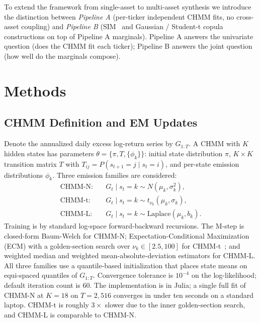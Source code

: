 \documentclass[sigconf,anonymous,nonacm=true]{acmart}
\begin{document}
To extend the framework from single-asset to multi-asset synthesis we
introduce the distinction between \emph{Pipeline A} (per-ticker
independent CHMM fits, no cross-asset coupling) and \emph{Pipeline B}
(SIM~\cite{sharpe1963simplified} and Gaussian / Student-t
copula~\cite{sklar1959fonctions, demarta2005tcopula} constructions on top
of Pipeline A marginals). Pipeline A answers the univariate question
(does the CHMM fit each ticker); Pipeline B answers the joint question
(how well do the marginals compose).

\section{Methods}
\label{sec:methods}

\subsection{CHMM Definition and EM Updates}
\label{sec:methods_chmm}

Denote the annualized daily excess log-return series by $G_{1:T}$. A CHMM
with $K$ hidden states has parameters $\theta = \{\pi, T, \{\phi_k\}\}$:
initial state distribution $\pi$, $K \times K$ transition matrix $T$ with
$T_{ij} = P(s_{t+1} = j \mid s_t = i)$, and per-state emission
distributions $\phi_k$. Three emission families are considered:
\begin{align}
  \text{CHMM-N}: \quad & G_t \mid s_t = k \sim N(\mu_k, \sigma_k^2), \\
  \text{CHMM-t}: \quad & G_t \mid s_t = k \sim t_{\nu_k}(\mu_k, \sigma_k), \\
  \text{CHMM-L}: \quad & G_t \mid s_t = k \sim \text{Laplace}(\mu_k, b_k).
\end{align}
Training is by standard log-space forward-backward recursions. The
M-step is closed-form Baum-Welch for CHMM-N; Expectation-Conditional
Maximization (ECM) with a golden-section search over $\nu_k \in
[2.5, 100]$ for CHMM-t~\cite{peel2000robust, liu1995ml}; and weighted
median and weighted mean-absolute-deviation estimators for
CHMM-L. All three families use a quantile-based initialization that
places state means on equi-spaced quantiles of $G_{1:T}$. Convergence
tolerance is $10^{-4}$ on the log-likelihood; default iteration count
is 60. The implementation is in Julia; a single full fit of CHMM-N at
$K = 18$ on $T = 2{,}516$ converges in under ten seconds on a standard
laptop. CHMM-t is roughly $3\times$ slower due to the inner golden-section
search, and CHMM-L is comparable to CHMM-N.
\end{document}
